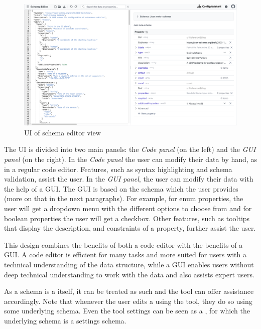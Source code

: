 \begin{figure}
    \includegraphics[width=\textwidth]{figures/schemaeditor}
    \caption{UI of schema editor view}
    \label{fig:schemaeditor}
\end{figure}


The UI is divided into two main panels: the  \textit{Code panel} (on the left) and the \textit{GUI panel} (on the right).
In the \textit{Code panel} the user can modify their data by hand, as in a regular code editor.
Features, such as syntax highlighting and schema validation, assist the user.
In the \textit{GUI panel}, the user can modify their data with the help of a GUI.
The GUI is based on the schema which the user provides (more on that in the next paragraphs).
For example, for enum properties, the user will get a dropdown menu with the different options to choose from and for boolean properties the user will get a checkbox.
Other features, such as tooltips that display the description, and constraints of a property, further assist the user.

This design combines the benefits of both a code editor with the benefits of a GUI.
A code editor is efficient for many tasks and more suited for users with a technical understanding of the data structure, while a GUI enables users without deep technical understanding to work with the data and also assists expert users.

As a schema is a \cfgfile{} itself, it can be treated as such and the tool can offer assistance accordingly.
Note that whenever the user edits a \cfgfile{} using the tool, they do so using some underlying schema.
Even the tool settings can be seen as a \cfgfile{}, for which the underlying schema is a settings schema.

